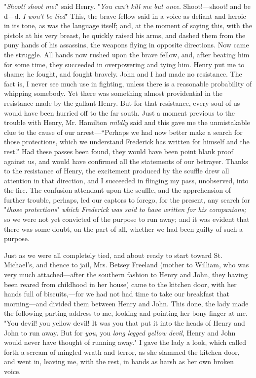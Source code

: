 "\emph{Shoot! shoot me!}" said Henry. "\emph{You can't kill me but
once}. Shoot!---shoot! and be d---d. \emph{I won't be tied}" This, the
brave fellow said in a voice as defiant and heroic in its tone, as was
the language itself; and, at the moment of saying this, with the pistols
at his very breast, he quickly raised his arms, and dashed them from the
puny hands of his assassins, the weapons flying in opposite directions.
Now came the struggle. All hands now rushed upon the brave fellow, and,
after beating him for some time, they succeeded in overpowering and
tying him. Henry put me to shame; he fought, and fought bravely. John
and I had made no resistance. The fact is, I never see much use in
fighting, unless there is a reasonable probability of whipping somebody.
Yet there was something almost providential in the resistance made by
the gallant Henry. But for that resistance, every soul of us would have
been hurried off to the far south. Just a moment previous to the trouble
with Henry, Mr. Hamilton \emph{mildly} said and this gave me the
unmistakable clue to the cause of our arrest---``Perhaps we had now
better make a search for those protections, which we understand
Frederick has written for himself and the rest.'' Had these passes been
found, they would have been point blank proof against us, and would have
confirmed all the statements of our betrayer. Thanks to the resistance
of Henry, the excitement produced by the scuffle drew all attention in
that direction, and I succeeded in flinging my pass, unobserved, into
the fire. {}The confusion attendant upon the scuffle, and the
apprehension of further trouble, perhaps, led our captors to forego, for
the present, any search for "\emph{those protections}" \emph{which
Frederick was said to have written for his companions;} so we were not
yet convicted of the purpose to run away; and it was evident that there
was some doubt, on the part of all, whether we had been guilty of such a
purpose.

Just as we were all completely tied, and about ready to start toward St.
Michael's, and thence to jail, Mrs. Betsey Freeland (mother to William,
who was very much attached---after the southern fashion to Henry and
John, they having been reared from childhood in her house) came to the
kitchen door, with her hands full of biscuits,---for we had not had time
to take our breakfast that morning---and divided them between Henry and
John. This done, the lady made the following parting address to me,
looking and pointing her bony finger at me. "You devil! you yellow
devil! It was you that put it into the heads of Henry and John to run
away. But for \emph{you}, you \emph{long legged yellow devil}, Henry and
John would never have thought of running away." I gave the lady a look,
which called forth a scream of mingled wrath and terror, as she slammed
the kitchen door, and went in, leaving me, with the rest, in hands as
harsh as her own broken voice.

